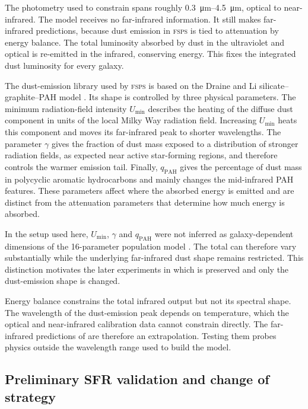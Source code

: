 \documentclass[12pt,a4paper]{article}
\begin{document}
The photometry used to constrain \popcosmos{} spans roughly \SIrange{0.3}{4.5}{\um},
optical to near-infrared. The model receives no far-infrared information. It still makes
far-infrared predictions, because dust emission in \textsc{fsps} is tied to attenuation
by  energy balance. The total luminosity absorbed by dust in the ultraviolet and
optical is re-emitted in the infrared, conserving energy. This fixes the integrated dust
luminosity \LIR{} for every galaxy.

The dust-emission library used by \textsc{fsps} is based on the Draine and Li
silicate--graphite--PAH model \citep{Draine_2007}. Its shape is controlled by three
physical parameters. The minimum radiation-field intensity $U_{\min}$ describes the
heating of the diffuse dust component in units of the local Milky Way radiation field.
Increasing $U_{\min}$ heats this component and moves its far-infrared peak to shorter
wavelengths. The parameter $\gamma$ gives the fraction of dust mass exposed to a
distribution of stronger radiation fields, as expected near active star-forming
regions, and therefore controls the warmer emission tail. Finally,
$q_{\mathrm{PAH}}$ gives the percentage of dust mass in polycyclic aromatic
hydrocarbons and mainly changes the mid-infrared PAH features. These parameters affect
where the absorbed energy is emitted and are distinct from the attenuation parameters
that determine how much energy is absorbed.

In the \popcosmos{} setup used here, $U_{\min}$, $\gamma$ and $q_{\mathrm{PAH}}$
were not inferred as galaxy-dependent dimensions of the 16-parameter population model
\citep{Alsing_2024,Thorp_2025_insights}.
The total \LIR{} can therefore vary substantially while the underlying far-infrared
dust shape remains restricted. This distinction motivates the later experiments in
which \LIR{} is preserved and only the dust-emission shape is changed.

Energy balance constrains the total infrared output but not its spectral shape. The
wavelength of the dust-emission peak depends on temperature, which the optical and
near-infrared calibration data cannot constrain directly. The far-infrared predictions
of \popcosmos{} are therefore an extrapolation. Testing them probes physics outside the
wavelength range used to build the model.

\subsection{Preliminary SFR validation and change of strategy}
\label{sec:intro:sfr-pivot}
\end{document}
